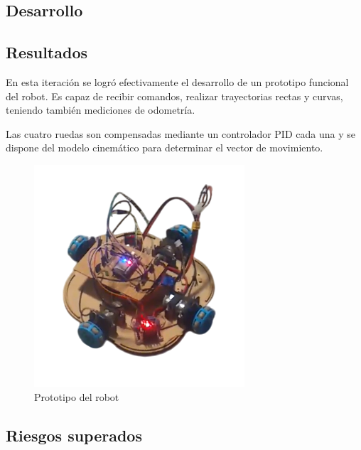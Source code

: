 \subsection{Desarrollo}













\subsection{Resultados}

En esta iteración se logró efectivamente el desarrollo de un prototipo funcional del robot. Es capaz de recibir comandos, realizar trayectorias rectas y curvas, teniendo también mediciones de odometría.

Las cuatro ruedas son compensadas mediante un controlador PID cada una y se dispone del modelo cinemático para determinar el vector de movimiento.

\begin{figure}[H]
    \centering
    \includegraphics[trim={0 1cm 0 1cm}, clip, width=0.55\linewidth]{images/robot_sin_imanes_prototipo.png}
    \caption{Prototipo del robot}
    \label{fig:primerprototiporobot}
\end{figure}


\subsection{Riesgos superados}

